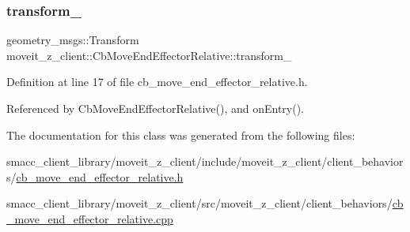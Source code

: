 \subsubsection{\texorpdfstring{transform\+\_\+}{transform\_}}
{\footnotesize\ttfamily geometry\+\_\+msgs\+::\+Transform moveit\+\_\+z\+\_\+client\+::\+Cb\+Move\+End\+Effector\+Relative\+::transform\+\_\+}



Definition at line 17 of file cb\+\_\+move\+\_\+end\+\_\+effector\+\_\+relative.\+h.



Referenced by Cb\+Move\+End\+Effector\+Relative(), and on\+Entry().



The documentation for this class was generated from the following files\+:\begin{DoxyCompactItemize}
\item 
smacc\+\_\+client\+\_\+library/moveit\+\_\+z\+\_\+client/include/moveit\+\_\+z\+\_\+client/client\+\_\+behaviors/\hyperlink{cb__move__end__effector__relative_8h}{cb\+\_\+move\+\_\+end\+\_\+effector\+\_\+relative.\+h}\item 
smacc\+\_\+client\+\_\+library/moveit\+\_\+z\+\_\+client/src/moveit\+\_\+z\+\_\+client/client\+\_\+behaviors/\hyperlink{cb__move__end__effector__relative_8cpp}{cb\+\_\+move\+\_\+end\+\_\+effector\+\_\+relative.\+cpp}\end{DoxyCompactItemize}
